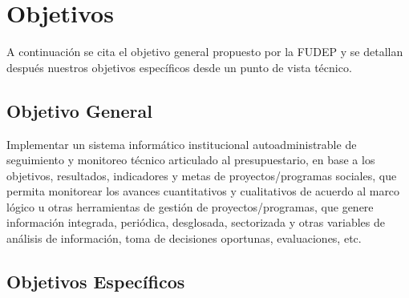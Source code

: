 \section{Objetivos}

A continuación se cita el objetivo general propuesto por la FUDEP y se detallan después nuestros objetivos específicos desde un punto de vista técnico.

\subsection{Objetivo General}

Implementar un sistema informático institucional autoadministrable de seguimiento y monitoreo técnico articulado al presupuestario, 
en base a los objetivos, resultados, indicadores y metas de proyectos/programas sociales, que permita monitorear los avances cuantitativos y cualitativos de acuerdo al marco lógico u otras herramientas de gestión de proyectos/programas,
que genere información integrada, periódica, desglosada, sectorizada y otras variables de análisis de información, toma de decisiones oportunas, evaluaciones, etc.

\subsection{Objetivos Específicos}

